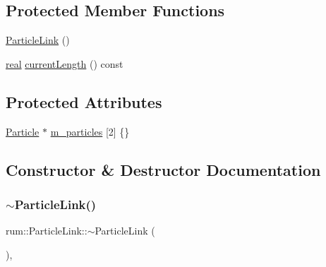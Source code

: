 \subsection*{Protected Member Functions}
\begin{DoxyCompactItemize}
\item 
\mbox{\hyperlink{classrum_1_1_particle_link_abcd2cccf1292b259443298ba7fc724d1}{Particle\+Link}} ()
\item 
\mbox{\hyperlink{namespacerum_a7e8cca23573d5eaead0f138cbaa4862c}{real}} \mbox{\hyperlink{classrum_1_1_particle_link_ad77a03be98566b0913aad0882e2283ac}{current\+Length}} () const
\end{DoxyCompactItemize}
\subsection*{Protected Attributes}
\begin{DoxyCompactItemize}
\item 
\mbox{\hyperlink{classrum_1_1_particle}{Particle}} $\ast$ \mbox{\hyperlink{classrum_1_1_particle_link_a0a919ccae0b5813620d5010d49094dc7}{m\+\_\+particles}} \mbox{[}2\mbox{]} \{\}
\end{DoxyCompactItemize}


\subsection{Constructor \& Destructor Documentation}
\mbox{\label{classrum_1_1_particle_link_a93add8689cecd885bfe9652d3d9dc440}} 
\subsubsection{\texorpdfstring{$\sim$\+Particle\+Link()}{~ParticleLink()}}
{\footnotesize\ttfamily rum\+::\+Particle\+Link\+::$\sim$\+Particle\+Link (\begin{DoxyParamCaption}{ }\end{DoxyParamCaption})\hspace{0.3cm}{\ttfamily [virtual]}, {\ttfamily [default]}}

\mbox{\label{classrum_1_1_particle_link_abcd2cccf1292b259443298ba7fc724d1}} 
